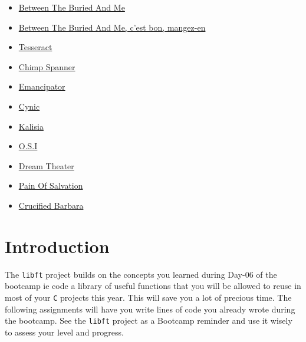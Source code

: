 \documentclass{42-en}
\begin{document}
    \begin{itemize}\itemsep7pt

        \item \href{https://www.youtube.com/watch?v=yqoLZpCexCk}{Between The Buried And Me}
        \item \href{https://www.youtube.com/watch?v=y3J-I7EWieg}{Between The Buried And Me, c'est bon, mangez-en}
        \item \href{https://www.youtube.com/watch?v=O-hnSlicxV4}{Tesseract}
        \item \href{http://www.youtube.com/watch?v=YecYHXhBE70}{Chimp Spanner}
        \item \href{http://www.youtube.com/watch?v=S4g7mPUskW8}{Emancipator}
        \item \href{http://www.youtube.com/watch?v=xcF6r4QVSXM}{Cynic}
        \item \href{http://www.youtube.com/watch?v=x0f_N6nTpmA}{Kalisia}
        \item \href{https://www.youtube.com/watch?v=k0NCIF7yWNs}{O.S.I}
        \item \href{http://www.youtube.com/watch?v=d6Y799Z7z-o}{Dream Theater}
        \item \href{http://www.youtube.com/watch?v=WO-lbBZbX24}{Pain Of Salvation}
        \item \href{http://www.youtube.com/watch?v=ig3L27s0BZg}{Crucified Barbara}\\

    \end{itemize}



\newpage
\chapter{Introduction}

    The \texttt{libft} project builds on the concepts you learned
    during Day-06 of the bootcamp ie code a library of useful
    functions that you will be allowed to reuse in most of your
    \texttt{C} projects this year. This will save you a lot of
    precious time. The following assignments will have you write lines
    of code you already wrote during the bootcamp. See the
    \texttt{libft} project as a Bootcamp reminder and use it wisely to
    assess your level and progress.
\end{document}
